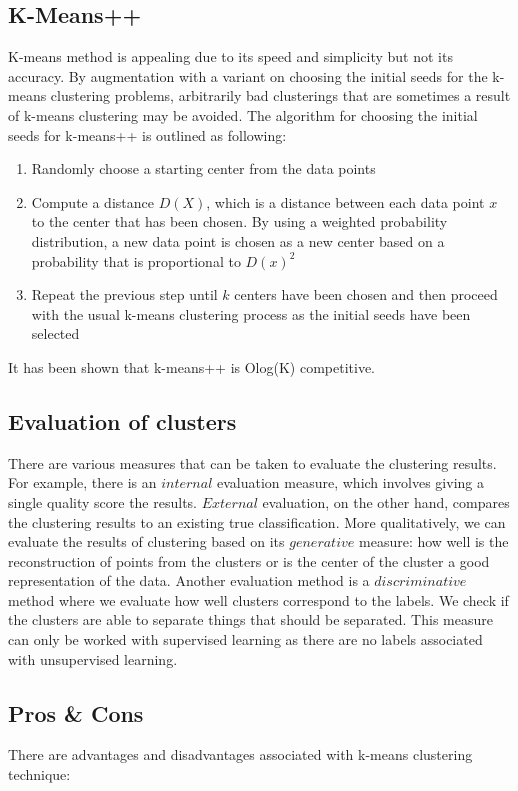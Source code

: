 \documentclass{article}
\begin{document}
\subsection{K-Means++}
K-means method is appealing due to its speed and simplicity but not its accuracy. By augmentation with a variant on choosing the initial seeds for the k-means clustering problems, arbitrarily bad clusterings that are sometimes a result of k-means clustering may be avoided. The algorithm for choosing the initial seeds for k-means++ is outlined as following:
\begin{enumerate}
    \item Randomly choose a starting center from the data points
    \item Compute a distance $D(X)$, which is a distance between each data point $x$ to the center that has been chosen. By using a weighted probability distribution, a new data point is chosen as a new center based on a probability that is proportional to $D(x)^2$
    \item Repeat the previous step until $k$ centers have been chosen and then proceed with the usual k-means clustering process as the initial seeds have been selected
\end{enumerate}
It has been shown that k-means++ is Olog(K) competitive.

\subsection{Evaluation of clusters}
There are various measures that can be taken to evaluate the clustering results. For example, there is an $internal$ evaluation measure, which involves giving a single quality score the results. $External$ evaluation, on the other hand, compares the clustering results to an existing true classification. More qualitatively, we can evaluate the results of clustering based on its $generative$ measure: how well is the reconstruction of points from the clusters or is the center of the cluster a good representation of the data. Another evaluation method is a $discriminative$ method where we evaluate how well clusters correspond to the labels. We check if the clusters are able to separate things that should be separated. This measure can only be worked with supervised learning as there are no labels associated with unsupervised learning. 

\subsection{Pros \& Cons}
There are advantages and disadvantages associated with k-means clustering technique:
\end{document}
